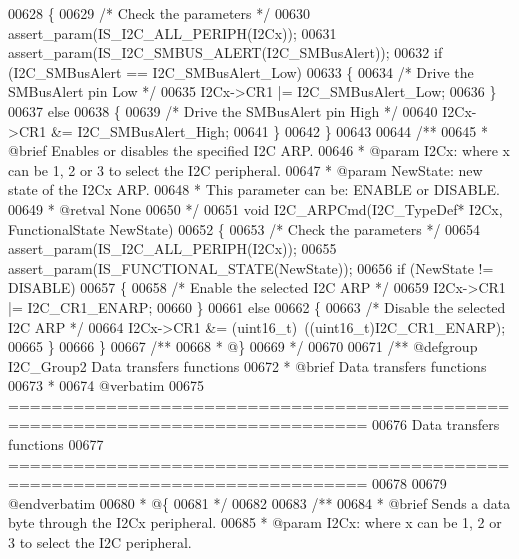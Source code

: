 \begin{DoxyCode}
00628 \{
00629   \textcolor{comment}{/* Check the parameters */}
00630   assert_param(IS\_I2C\_ALL\_PERIPH(I2Cx));
00631   assert_param(IS\_I2C\_SMBUS\_ALERT(I2C\_SMBusAlert));
00632   \textcolor{keywordflow}{if} (I2C\_SMBusAlert == I2C_SMBusAlert_Low)
00633   \{
00634     \textcolor{comment}{/* Drive the SMBusAlert pin Low */}
00635     I2Cx->CR1 |= I2C_SMBusAlert_Low;
00636   \}
00637   \textcolor{keywordflow}{else}
00638   \{
00639     \textcolor{comment}{/* Drive the SMBusAlert pin High  */}
00640     I2Cx->CR1 &= I2C_SMBusAlert_High;
00641   \}
00642 \}
00643 
00644 \textcolor{comment}{/**}
00645 \textcolor{comment}{  * @brief  Enables or disables the specified I2C ARP.}
00646 \textcolor{comment}{  * @param  I2Cx: where x can be 1, 2 or 3 to select the I2C peripheral.}
00647 \textcolor{comment}{  * @param  NewState: new state of the I2Cx ARP. }
00648 \textcolor{comment}{  *          This parameter can be: ENABLE or DISABLE.}
00649 \textcolor{comment}{  * @retval None}
00650 \textcolor{comment}{  */}
00651 \textcolor{keywordtype}{void} I2C_ARPCmd(I2C\_TypeDef* I2Cx, FunctionalState NewState)
00652 \{
00653   \textcolor{comment}{/* Check the parameters */}
00654   assert_param(IS\_I2C\_ALL\_PERIPH(I2Cx));
00655   assert_param(IS\_FUNCTIONAL\_STATE(NewState));
00656   \textcolor{keywordflow}{if} (NewState != DISABLE)
00657   \{
00658     \textcolor{comment}{/* Enable the selected I2C ARP */}
00659     I2Cx->CR1 |= I2C_CR1_ENARP;
00660   \}
00661   \textcolor{keywordflow}{else}
00662   \{
00663     \textcolor{comment}{/* Disable the selected I2C ARP */}
00664     I2Cx->CR1 &= (uint16\_t)~((uint16\_t)I2C_CR1_ENARP);
00665   \}
00666 \}
00667 \textcolor{comment}{/**}
00668 \textcolor{comment}{  * @\}}
00669 \textcolor{comment}{  */}
00670 
00671 \textcolor{comment}{/** @defgroup I2C\_Group2 Data transfers functions}
00672 \textcolor{comment}{ *  @brief   Data transfers functions }
00673 \textcolor{comment}{ *}
00674 \textcolor{comment}{@verbatim   }
00675 \textcolor{comment}{ ===============================================================================}
00676 \textcolor{comment}{                        Data transfers functions}
00677 \textcolor{comment}{ ===============================================================================  }
00678 \textcolor{comment}{}
00679 \textcolor{comment}{@endverbatim}
00680 \textcolor{comment}{  * @\{}
00681 \textcolor{comment}{  */}
00682 
00683 \textcolor{comment}{/**}
00684 \textcolor{comment}{  * @brief  Sends a data byte through the I2Cx peripheral.}
00685 \textcolor{comment}{  * @param  I2Cx: where x can be 1, 2 or 3 to select the I2C peripheral.}

\end{DoxyCode}
